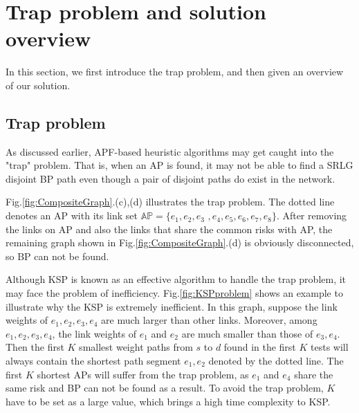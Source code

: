 \section{Trap problem and solution overview }
\label{sec:Trap problem and solution overview }

In this section, we first introduce the trap problem, and then given an overview of our solution.
\subsection{Trap problem}

As discussed earlier, APF-based heuristic algorithms may get caught into the "trap" problem. That is, when an AP is found, it may not be able to find a SRLG disjoint BP path even though a pair of disjoint paths do exist in the network.



Fig.\ref{fig:CompositeGraph}.(c),(d) illustrates the trap problem. The dotted line denotes an AP with its link set
$\mathbb{AP}=\{e_1,e_2,e_3$ $,e_4,e_5,e_6,e_7,e_8\}$. After removing the links on AP and also the links that share the common risks with AP, the remaining graph shown in Fig.\ref{fig:CompositeGraph}.(d) is obviously disconnected, so BP can not be found.


Although KSP is known as an effective algorithm to handle the trap
problem, it may face the problem of inefficiency.  Fig.\ref{fig:KSPproblem}  shows an example to illustrate why the KSP is extremely inefficient. In this graph, suppose  the link weights of $e_1, e_2, e_3, e_4$ are much larger than other links. Moreover, among $e_1, e_2, e_3, e_4$, the link weights of $e_1$ and $e_2$ are much smaller  than those of $e_3, e_4$. Then the first $K$ smallest weight paths from $s$ to $d$ found in the first $K$ tests will always contain the shortest path segment $e_1,e_2$ denoted by the dotted line. The first $K$ shortest APs will suffer from the trap problem, as $e_1$ and $e_4$ share the same risk and BP can not be found as a result. To avoid the trap problem, $K$ have to be set as a large value, which brings a high time complexity to KSP.

